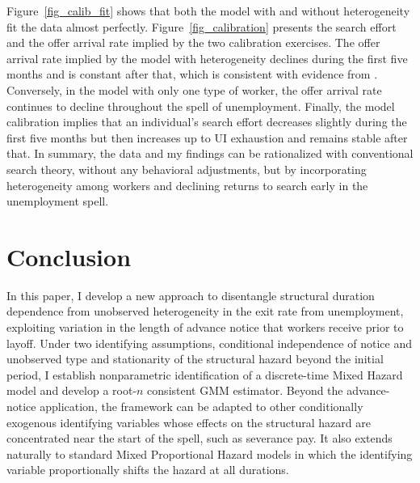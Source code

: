 \documentclass{div}
\begin{document}
Figure~\ref{fig_calib_fit} shows that both the model with and without heterogeneity fit the data almost perfectly. Figure~\ref{fig_calibration} presents the search effort and the offer arrival rate implied by the two calibration exercises. The offer arrival rate implied by the model with heterogeneity declines during the first five months and is constant after that, which is consistent with evidence from \cite{KroftEtAl2013}.  Conversely, in the model with only one type of worker, the offer arrival rate continues to decline throughout the spell of unemployment. Finally, the model calibration implies that an individual's search effort decreases slightly during the first five months but then increases up to UI exhaustion and remains stable after that. In summary, the data and my findings can be rationalized with conventional search theory, without any behavioral adjustments, but by incorporating heterogeneity among workers and declining returns to search early in the unemployment spell.


\section{Conclusion}\label{sec_conclusion}

In this paper, I develop a new approach to disentangle structural duration dependence from unobserved heterogeneity in the exit rate from unemployment, exploiting variation in the length of advance notice that workers receive prior to layoff. Under two identifying assumptions, conditional independence of notice and unobserved type and stationarity of the structural hazard beyond the initial period, I establish nonparametric identification of a discrete-time Mixed Hazard model and develop a root-$n$ consistent GMM estimator. Beyond the advance-notice application, the framework can be adapted to other conditionally exogenous identifying variables whose effects on the structural hazard are concentrated near the start of the spell, such as severance pay. It also extends naturally to standard Mixed Proportional Hazard models in which the identifying variable proportionally shifts the hazard at all durations.
\end{document}
